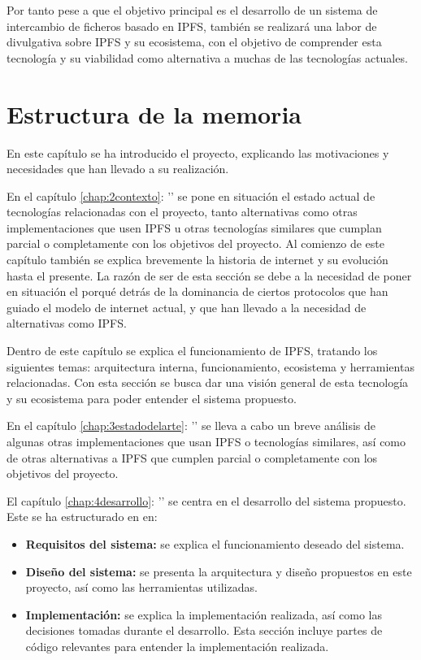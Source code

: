 Por tanto pese a que el objetivo principal es el desarrollo de un sistema de intercambio de ficheros basado en IPFS,
también se realizará una labor de divulgativa sobre  IPFS y su ecosistema, con el objetivo de comprender esta
tecnología y su viabilidad como alternativa a muchas de las tecnologías actuales.


\section{Estructura de la memoria}
En este capítulo se ha introducido el proyecto, explicando las motivaciones y necesidades que han llevado a su realización.

En el capítulo \ref{chap:2contexto}: '' se pone en situación el estado actual de tecnologías relacionadas con el proyecto, tanto alternativas
como otras implementaciones que usen IPFS u otras tecnologías similares que cumplan parcial o completamente con los objetivos del proyecto.
Al comienzo de este capítulo también se explica brevemente la historia de internet y su evolución hasta el presente.
La razón de ser de esta sección se debe a la necesidad de poner en situación el porqué detrás de la dominancia de ciertos
protocolos que han guiado el modelo de internet actual, y que han llevado a la necesidad de alternativas como IPFS.

Dentro de este capítulo se explica el funcionamiento de IPFS, tratando los siguientes temas: arquitectura interna, funcionamiento,
ecosistema y herramientas relacionadas. Con esta sección se busca dar una visión general de esta tecnología y su ecosistema para
poder entender el sistema propuesto.

En el capítulo \ref{chap:3estadodelarte}: '' se lleva a cabo un breve análisis
de algunas otras implementaciones que usan IPFS o tecnologías similares, así como de otras alternativas a IPFS que cumplen
parcial o completamente con los objetivos del proyecto.

El capítulo \ref{chap:4desarrollo}: '' se centra en el desarrollo del sistema propuesto. Este se ha estructurado en en:
\begin{itemize}
      \item \textbf{Requisitos del sistema:} se explica el funcionamiento deseado del sistema.
      \item \textbf{Diseño del sistema:} se presenta la arquitectura y diseño propuestos en este proyecto, así como las herramientas utilizadas.
      \item \textbf{Implementación:} se explica la implementación realizada, así como las decisiones tomadas durante el desarrollo. Esta sección
            incluye partes de código relevantes para entender la implementación realizada.
\end{itemize}

